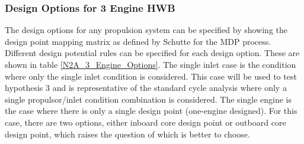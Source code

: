 		\subsubsection{Design Options for 3 Engine HWB}
			The design options for any propulsion system can be specified by showing the design point mapping matrix as defined by Schutte for the MDP process.  Different design potential rules can be specified for each design option.  These are shown in table \ref{N2A_3_Engine_Options}.  The single inlet case is the condition where only the single inlet condition is considered.  This case will be used to test hypothesis 3 and is representative of the standard cycle analysis where only a single propulsor/inlet condition combination is considered.  The single engine is the case where there is only a single design point (one-engine designed).  For this case, there are two options, either inboard core design point or outboard core design point, which raises the question of which is better to choose.  
